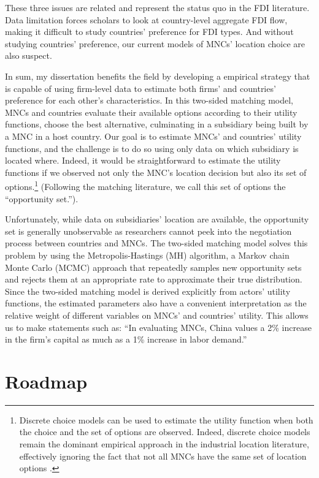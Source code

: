 These three issues are related and represent the status quo in the FDI
literature. Data limitation forces scholars to look at country-level aggregate
FDI flow, making it difficult to study countries' preference for FDI types. And
without studying countries' preference, our current models of MNCs' location
choice are also suspect.

In sum, my dissertation benefits the field by developing a empirical strategy
that is capable of using firm-level data to estimate both firms' and countries'
preference for each other's characteristics. In this two-sided matching model,
MNCs and countries evaluate their available options according to their utility
functions, choose the best alternative, culminating in a subsidiary being built
by a MNC in a host country. Our goal is to estimate MNCs' and countries' utility
functions, and the challenge is to do so using only data on which subsidiary is
located where. Indeed, it would be straightforward to estimate the utility
functions if we observed not only the MNC's location decision but also its set
of options.\footnote{Discrete choice models can be used to estimate the utility
  function when both the choice and the set of options are observed. Indeed,
  discrete choice models remain the dominant empirical approach in the
  industrial location literature, effectively ignoring the fact that not all
  MNCs have the same set of location options \citep{Arauzo-Carod2010}.}
(Following the matching literature, we call this set of options the
``opportunity set.'').

Unfortunately, while data on subsidiaries' location are available, the
opportunity set is generally unobservable as researchers cannot peek into the
negotiation process between countries and MNCs. The two-sided matching model
solves this problem by using the Metropolis-Hastings (MH) algorithm, a Markov
chain Monte Carlo (MCMC) approach that repeatedly samples new opportunity sets
and rejects them at an appropriate rate to approximate their true distribution.
Since the two-sided matching model is derived explicitly from actors' utility
functions, the estimated parameters also have a convenient interpretation as the
relative weight of different variables on MNCs' and countries' utility. This
allows us to make statements such as: ``In evaluating MNCs, China values a 2\%
increase in the firm's capital as much as a 1\% increase in labor demand.''

\section{Roadmap}

